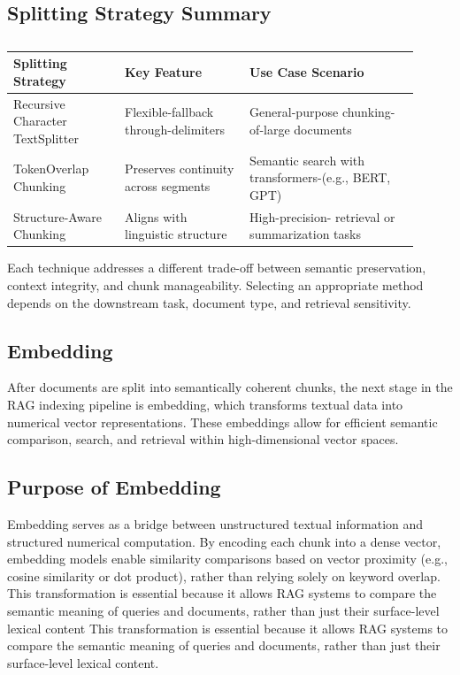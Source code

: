 \documentclass[twocolumn, 10pt]{article}
\begin{document}
\subsection{Splitting Strategy Summary}

\begin{table}[H]
\centering
\begin{tabular}{|p{0.25\linewidth}|p{0.28\linewidth}|p{0.38\linewidth}|}
\hline
\textbf{Splitting Strategy} & \textbf{Key Feature} & \textbf{Use Case Scenario} \\
\hline
Recursive Character TextSplitter & Flexible-fallback through-delimiters & General-purpose chunking-of-large documents \\
\hline
TokenOverlap Chunking & Preserves continuity across segments & Semantic search with transformers-(e.g., BERT, GPT) \\
\hline
Structure-Aware Chunking & Aligns with linguistic structure & High-precision- retrieval or summarization tasks \\
\hline
\end{tabular}
\caption{}
\label{tab:splitting-strategies}
\end{table}



Each technique addresses a different trade-off between semantic preservation, context integrity, and chunk manageability. Selecting an appropriate method depends on the downstream task, document type, and retrieval sensitivity.

\subsection{Embedding}

After documents are split into semantically coherent chunks, the next stage in the RAG indexing pipeline is embedding, which transforms textual data into numerical vector representations. These embeddings allow for efficient semantic comparison, search, and retrieval within high-dimensional vector spaces.

\subsection{Purpose of Embedding}

Embedding serves as a bridge between unstructured textual information and structured numerical computation. By encoding each chunk into a dense vector, embedding models enable similarity comparisons based on vector proximity (e.g., cosine similarity or dot product), rather than relying solely on keyword overlap. This transformation is essential because it allows RAG systems to compare the semantic meaning of queries and documents, rather than just their surface-level lexical content This transformation is essential because it allows RAG systems to compare the semantic meaning of queries and documents, rather than just their surface-level lexical content.
\end{document}
